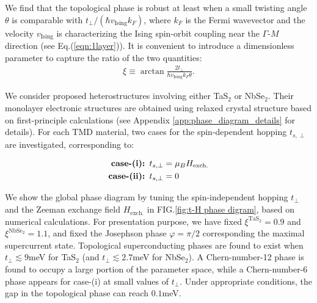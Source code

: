 We find that the topological phase is robust at least when a small twisting angle $\theta$ is comparable with $t_\perp/(\hbar v_{\text{Ising}} k_F)$, where $k_F$ is the Fermi wavevector and the velocity $v_{\text{Ising}}$ is characterizing the Ising spin-orbit coupling near the $\Gamma$-$M$ direction (see Eq.(\ref{eqn:1layer})). It is convenient to introduce a dimensionless parameter to capture the ratio of the two quantities:
\begin{align}
	\xi\equiv \arctan \frac{2t_\perp}{\hbar v_{\text{Ising}} k_F\theta}.\label{eqn:xi}
\end{align}

We consider proposed heterostructures involving either TaS$_2$ or NbSe$_2$. Their monolayer electronic structures are obtained using relaxed crystal structure based on first-principle calculations (see Appendix \ref{app:phase_diagram_details} for details). For each TMD material, two cases for the spin-dependent hopping $t_{s,\perp}$ are investigated, corresponding to:

\begin{align}
	\textbf{case-(i): }  & t_{s,\perp}=\mu_BH_{\text{exch.}}\notag \\
	\textbf{case-(ii): } & t_{s,\perp}=0\label{eqn:cases}
\end{align}


We show the global phase diagram by tuning the spin-independent hopping $t_\perp$ and the Zeeman exchange field $H_{\text{exch.}}$ in FIG.\ref{fig:t-H phase digram}, based on numerical calculations. For presentation purpose, we have fixed $\xi^{\mathrm{TaS_2}}=0.9$ and $\xi^{\mathrm{NbSe_2}}=1.1$, and fixed the Josephson phase $\varphi=\pi/2$ corresponding the maximal supercurrent state. Topological superconducting phases are found to exist when $t_\perp\lesssim 9$meV for TaS$_2$ (and $t_\perp\lesssim 2.7$meV for NbSe$_2$). A Chern-number-12 phase is found to occupy a large portion of the parameter space, while a Chern-number-6 phase appears for case-(i) at small values of $t_\perp$. Under appropriate conditions, the gap in the topological phase can reach $0.1$meV.

